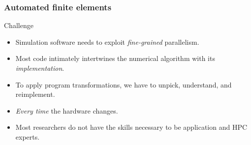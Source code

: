 \documentclass[presentation]{beamer}
\begin{document}
\begin{frame}
  \frametitle{Automated finite elements}
  \begin{block}{Challenge}
  \begin{itemize}
  \item Simulation software needs to exploit \emph{fine-grained}
    parallelism.
  \item Most code intimately intertwines the numerical algorithm with
    its \emph{implementation}.
  \item To apply program transformations, we have to unpick,
    understand, and reimplement.
  \item \emph{Every time} the hardware changes.
  \item Most researchers do not have the skills necessary to be
    application and HPC experts.
  \end{itemize}
  \end{block}
\end{frame}
\end{document}
